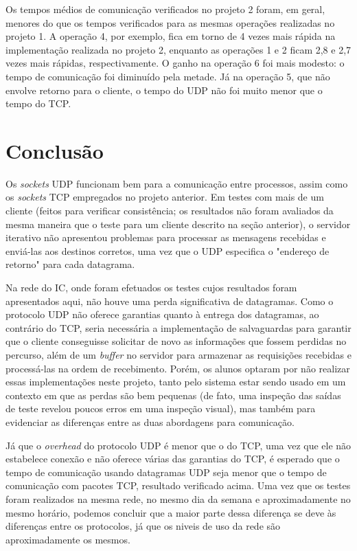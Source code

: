 \documentclass[11pt, brazil]{article} %
\begin{document}
Os tempos médios de comunicação verificados no projeto 2 foram, em geral, menores do que os tempos verificados para as mesmas operações realizadas no projeto 1. A operação 4, por exemplo, fica em torno de 4 vezes mais rápida na implementação realizada no projeto 2, enquanto as operações 1 e 2 ficam 2,8 e 2,7 vezes mais rápidas, respectivamente. O ganho na operação 6 foi mais modesto: o tempo de comunicação foi diminuído pela metade. Já na operação 5, que não envolve retorno para o cliente, o tempo do UDP não foi muito menor que o tempo do TCP.


\section{Conclusão}

Os \emph{sockets} UDP funcionam bem para a comunicação entre processos, assim como os \emph{sockets} TCP empregados no projeto anterior. 
Em testes com mais de um cliente (feitos para verificar consistência; os resultados não foram avaliados da mesma maneira que o teste para um cliente descrito na seção anterior), o servidor iterativo não apresentou problemas para processar as mensagens recebidas e enviá-las aos destinos corretos, uma vez que o UDP especifica o "endereço de retorno" para cada datagrama. 

Na rede do IC, onde foram efetuados os testes cujos resultados foram apresentados aqui, não houve uma perda significativa de datagramas. 
Como o protocolo UDP não oferece garantias quanto à entrega dos datagramas, ao contrário do TCP, seria necessária a implementação de salvaguardas para garantir que o cliente conseguisse solicitar de novo as informações que fossem perdidas no percurso, além de um \emph{buffer} no servidor para armazenar as requisições recebidas e processá-las na ordem de recebimento.
Porém, os alunos optaram por não realizar essas implementações neste projeto, tanto pelo sistema estar sendo usado em um contexto em que as perdas são bem pequenas (de fato, uma inspeção das saídas de teste revelou poucos erros em uma inspeção visual), mas também para evidenciar as diferenças entre as duas abordagens para comunicação.

Já que o \emph{overhead} do protocolo UDP é menor que o do TCP, uma vez que ele não estabelece conexão e não oferece várias das garantias do TCP, é esperado que o tempo de comunicação usando datagramas UDP seja menor que o tempo de comunicação com pacotes TCP, resultado verificado acima. 
Uma vez que os testes foram realizados na mesma rede, no mesmo dia da semana e aproximadamente no mesmo horário, podemos concluir que a maior parte dessa diferença se deve às diferenças entre os protocolos, já que os niveis de uso da rede são aproximadamente os mesmos.
\end{document}
